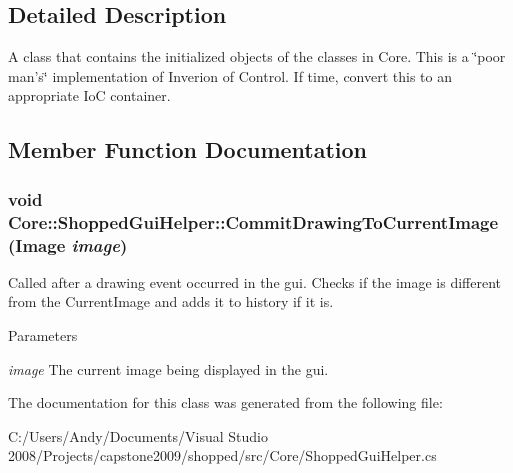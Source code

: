 \subsection{Detailed Description}
A class that contains the initialized objects of the classes in Core. This is a \char`\"{}poor man's\char`\"{} implementation of Inverion of Control. If time, convert this to an appropriate IoC container. 

\subsection{Member Function Documentation}
\hypertarget{class_core_1_1_shopped_gui_helper_abdeacf592b564050489f0c9c7c0f6f43}{
\subsubsection[{CommitDrawingToCurrentImage}]{\setlength{\rightskip}{0pt plus 5cm}void Core::ShoppedGuiHelper::CommitDrawingToCurrentImage (Image {\em image})}}
\label{class_core_1_1_shopped_gui_helper_abdeacf592b564050489f0c9c7c0f6f43}
Called after a drawing event occurred in the gui. Checks if the image is different from the CurrentImage and adds it to history if it is.


\begin{DoxyParams}{Parameters}
\item[{\em image}]The current image being displayed in the gui. \end{DoxyParams}


The documentation for this class was generated from the following file:\begin{DoxyCompactItemize}
\item 
C:/Users/Andy/Documents/Visual Studio 2008/Projects/capstone2009/shopped/src/Core/ShoppedGuiHelper.cs\end{DoxyCompactItemize}
